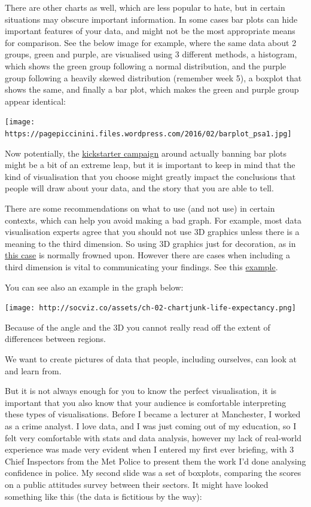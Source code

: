 \documentclass[]{book}
\theoremstyle{definition}
\theoremstyle{definition}
\theoremstyle{definition}
\theoremstyle{remark}
\begin{document}
There are other charts as well, which are less popular to hate, but in
certain situations may obscure important information. In some cases bar
plots can hide important features of your data, and might not be the
most appropriate means for comparison. See the below image for example,
where the same data about 2 groups, green and purple, are visualised
using 3 different methods, a histogram, which shows the green group
following a normal distribution, and the purple group following a
heavily skewed distribution (remember week 5), a boxplot that shows the
same, and finally a bar plot, which makes the green and purple group
appear identical:

\texttt{[image: https://pagepiccinini.files.wordpress.com/2016/02/barplot\_psa1.jpg]}

Now potentially, the
\href{https://www.kickstarter.com/projects/1474588473/barbarplots/description}{kickstarter
campaign} around actually banning bar plots might be a bit of an extreme
leap, but it is important to keep in mind that the kind of visualisation
that you choose might greatly impact the conclusions that people will
draw about your data, and the story that you are able to tell.

There are some recommendations on what to use (and not use) in certain
contexts, which can help you avoid making a bad graph. For example, most
data visualisation experts agree that you should not use 3D graphics
unless there is a meaning to the third dimension. So using 3D graphics
just for decoration, as in
\href{https://mir-s3-cdn-cf.behance.net/project_modules/disp/2505dd10837923.56030acd2ef20.jpg}{this
case} is normally frowned upon. However there are cases when including a
third dimension is vital to communicating your findings. See this
\href{http://www.visualisingdata.com/2015/03/when-3d-works/}{example}.

You can see also an example in the graph below:

\texttt{[image: http://socviz.co/assets/ch-02-chartjunk-life-expectancy.png]}

Because of the angle and the 3D you cannot really read off the extent of
differences between regions.

We want to create pictures of data that people, including ourselves, can
look at and learn from.

But it is not always enough for you to know the perfect visualisation,
it is important that you also know that your audience is comfortable
interpreting these types of visualisations. Before I became a lecturer
at Manchester, I worked as a crime analyst. I love data, and I was just
coming out of my education, so I felt very comfortable with stats and
data analysis, however my lack of real-world experience was made very
evident when I entered my first ever briefing, with 3 Chief Inspectors
from the Met Police to present them the work I'd done analysing
confidence in police. My second slide was a set of boxplots, comparing
the scores on a public attitudes survey between their sectors. It might
have looked something like this (the data is fictitious by the way):
\end{document}
